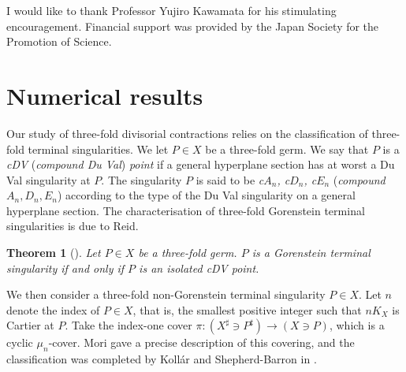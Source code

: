 \documentclass[a4paper,11pt]{amsart}
\newtheorem{theorem}{Theorem}[section]
\theoremstyle{definition}
\theoremstyle{remark}
\numberwithin{equation}{section}
\begin{document}
I would like to thank Professor Yujiro Kawamata
for his stimulating encouragement.
Financial support was provided by
the Japan Society for the Promotion of Science.

\section{Numerical results}\label{sec:numerical}
Our study of three-fold divisorial contractions relies on
the classification of three-fold terminal singularities.
We let $P \in X$ be a three-fold germ.
We say that $P$ is a \textit{cDV} (\textit{compound Du Val}) \textit{point}
if a general hyperplane section has at worst a Du Val singularity at $P$.
The singularity $P$ is said to be
\textit{c$A_n$, c$D_n$, c$E_n$} (\textit{compound $A_n, D_n, E_n$})
according to the type of the Du Val singularity on
a general hyperplane section.
The characterisation of three-fold Gorenstein terminal singularities
is due to Reid.

\begin{theorem}[{\cite{Re83}}]\label{thm:Re83}
Let $P \in X$ be a three-fold germ.
$P$ is a Gorenstein terminal singularity if and only if
$P$ is an isolated cDV point.
\end{theorem}

We then consider a three-fold non-Gorenstein terminal singularity $P \in X$.
Let $n$ denote the index of $P \in X$,
that is, the smallest positive integer such that $nK_X$ is Cartier at $P$.
Take the index-one cover $\pi \colon (X^\sharp \ni P^\sharp) \to (X \ni P)$,
which is a cyclic $\mu_n$-cover.
Mori gave a precise description of this covering,
and the classification was completed by
Koll\'ar and Shepherd-Barron in \cite[Theorem 6.4]{KS88}.
\end{document}
